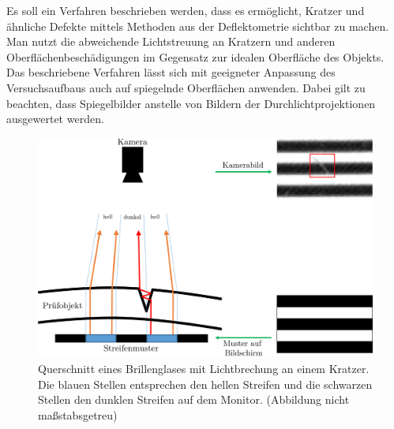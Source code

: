 Es soll ein Verfahren beschrieben werden, dass es ermöglicht, Kratzer und ähnliche Defekte mittels Methoden aus der Deflektometrie sichtbar zu machen.
Man nutzt die abweichende Lichtstreuung an Kratzern und anderen Oberflächenbeschädigungen im Gegensatz zur idealen Oberfläche des Objekts.
Das beschriebene Verfahren lässt sich mit geeigneter Anpassung des Versuchsaufbaus auch auf spiegelnde Oberflächen anwenden.
Dabei gilt zu beachten, dass Spiegelbilder anstelle von Bildern der Durchlichtprojektionen ausgewertet werden.

\begin{figure}[H]
	\centering
	\includegraphics[width=\textwidth]{03_sichtpruefungDurchLichtstreuung/verfahren/figures/scratch_reflection_with_images}
	\caption[Lichtbrechung an einem Kratzer]{Querschnitt eines Brillenglases mit Lichtbrechung an einem Kratzer. Die blauen Stellen entsprechen den hellen Streifen und die schwarzen Stellen den dunklen Streifen auf dem Monitor. (Abbildung nicht maßstabsgetreu)}
	\label{img:lightreflection}
\end{figure}

